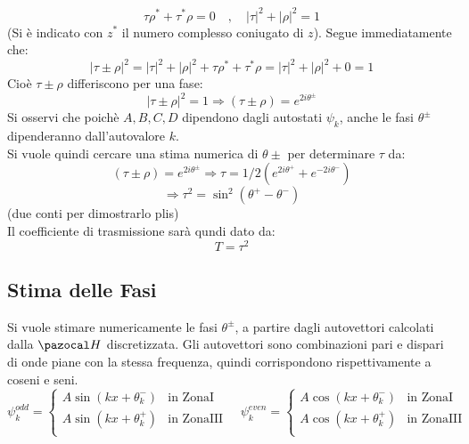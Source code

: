 $$ \tau\rho^* + \tau^*\rho = 0 \quad,\quad |\tau|^2 + |\rho|^2 = 1$$
(Si è indicato con $z^*$ il numero complesso coniugato di $z$). Segue immediatamente che:
$$ |\tau \pm \rho|^2 = |\tau|^2 + |\rho|^2 + \tau\rho^* + \tau^*\rho = |\tau|^2 + |\rho|^2 + 0 = 1$$
Cioè $\tau \pm \rho$ differiscono per una fase:
$$ |\tau \pm \rho|^2 = 1 \Rightarrow (\tau \pm \rho) = e^{2i\theta^\pm}$$
Si osservi che poichè $A,B,C,D$ dipendono dagli autostati $\psi_k$, anche le fasi $\theta^\pm$ dipenderanno dall'autovalore $k$.\\
Si vuole quindi cercare una stima numerica di $\theta\pm$ per determinare $\tau$ da:
    $$ (\tau \pm \rho) = e^{2i\theta^\pm} \Rightarrow \tau = 1/2(e^{2i\theta^+}+e^{-2i\theta^-})$$
    $$ \Rightarrow \tau^2 = \sin^2(\theta^+ - \theta^-)$$
(due conti per dimostrarlo plis)
\\
Il coefficiente di trasmissione sarà qundi dato da:
    $$T = \tau^2$$

\subsection*{Stima delle Fasi}
Si vuole stimare numericamente le fasi $\theta^\pm$, a partire dagli autovettori
calcolati dalla $\Hh$ discretizzata. Gli autovettori sono combinazioni pari e dispari
di onde piane con la stessa frequenza, quindi corrispondono rispettivamente a coseni e seni.
    $$ \psi_k^{odd} = \begin{cases}
        A\sin(kx + \theta^-_k) & \mbox{in ZonaI} \\
        A\sin(kx + \theta^+_k) & \mbox{in ZonaIII} \\
    \end{cases}
    \quad
    \psi_k^{even} = \begin{cases}
        A\cos(kx + \theta^-_k) & \mbox{in ZonaI} \\
        A\cos(kx + \theta^+_k) & \mbox{in ZonaIII} \\
    \end{cases}
    $$

